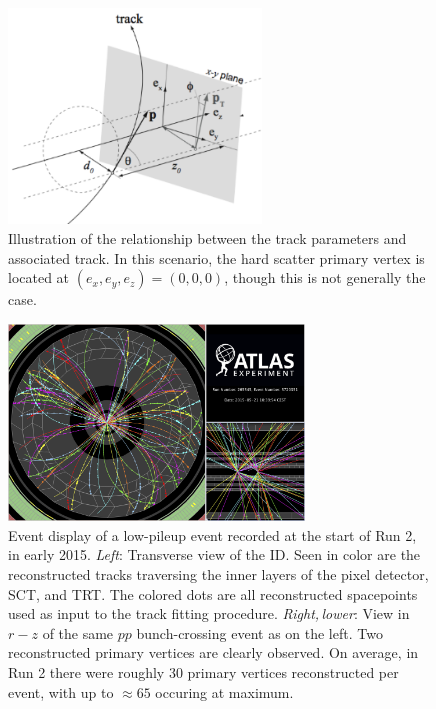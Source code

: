 \begin{figure}[!htb]
    \begin{center}
        \includegraphics[width=0.6\textwidth]{figures/chapter3/perigee_params}
        \caption{
            Illustration of the relationship between the track parameters and associated track.
            In this scenario, the hard scatter primary vertex is located
            at $(e_x, e_y, e_z) = (0,0,0)$, though this is not generally the case.
        }
        \label{fig:track_params}
    \end{center}
\end{figure}

\begin{figure}[!htb]
    \begin{center}
        \includegraphics[width=0.7\textwidth]{figures/chapter3/event_display_tracking_vertexing}
        \caption{
            Event display of a low-pileup event recorded at the start of Run 2, in early 2015.
            \textit{Left}: Transverse view of the ID. Seen in color are the reconstructed tracks traversing
                the inner layers of the pixel detector, SCT, and TRT. The colored dots are all reconstructed
                spacepoints used as input to the track fitting procedure.
            \textit{Right,\,lower}: View in $r-z$ of the same $pp$ bunch-crossing event as on the left.
                Two reconstructed primary vertices are clearly observed.
                On average, in Run 2 there were roughly 30 primary vertices reconstructed per event, with
                up to $\approx65$ occuring at maximum.
        }
        \label{fig:id_event_display}
    \end{center}
\end{figure}
\FloatBarrier
